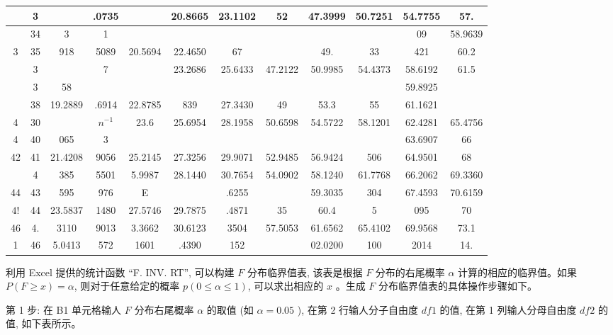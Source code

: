 \documentclass[10pt]{article}
\begin{document}
\begin{CJK*}{UTF8}{bsmi}
\begin{center}
\begin{tabular}{|c|c|c|c|c|c|c|c|c|c|c|c|}
 & 3 &  & .0735 &  & 20.8665 & 23.1102 & 52 & 47.3999 & 50.7251 & 54.7755 & 57. \\
\hline
 & 34 & 3 & 1 &  &  &  &  &  &  & 09 & 58.9639 \\
\hline
3 & 35 & 918 & 5089 & 20.5694 & 22.4650 & 67 &  & 49. & 33 & 421 & 60.2 \\
\hline
 & 3 &  & 7 &  & 23.2686 & 25.6433 & 47.2122 & 50.9985 & 54.4373 & 58.6192 & 61.5 \\
\hline
 & 3 & 58 &  &  &  &  &  &  &  & 59.8925 &  \\
\hline
 & 38 & 19.2889 & .6914 & 22.8785 & 839 & 27.3430 & 49 & 53.3 & 55 & 61.1621 &  \\
\hline
4 & 30 &  & $n^{-1}$ & 23.6 & 25.6954 & 28.1958 & 50.6598 & 54.5722 & 58.1201 & 62.4281 & 65.4756 \\
\hline
4 & 40 & 065 & 3 &  &  &  &  &  &  & 63.6907 & 66 \\
\hline
42 & 41 & 21.4208 & 9056 & 25.2145 & 27.3256 & 29.9071 & 52.9485 & 56.9424 & 506 & 64.9501 & 68 \\
\hline
 & 4 & 385 & 5501 & 5.9987 & 28.1440 & 30.7654 & 54.0902 & 58.1240 & 61.7768 & 66.2062 & 69.3360 \\
\hline
44 & 43 & 595 & 976 & E &  & .6255 &  & 59.3035 & 304 & 67.4593 & 70.6159 \\
\hline
$4 !$ & 44 & 23.5837 & 1480 & 27.5746 & 29.7875 & .4871 & 35 & 60.4 & 5 & 095 & 70 \\
\hline
46 & 4. & 3110 & 9013 & 3.3662 & 30.6123 & 3504 & 57.5053 & 61.6562 & 65.4102 & 69.9568 & 73.1 \\
\hline
1 & 46 & 5.0413 & 572 & 1601 & .4390 & 152 &  & 02.0200 & 100 & 2014 & 14. \\
\hline
\end{tabular}
\end{center}

\begin{center}
\end{center}

利用 Excel 提供的统计函数 “F. INV. RT”, 可以构建 $F$ 分布临界值表, 该表是根据 $F$ 分布的右尾概率 $\alpha$ 计算的相应的临界值。如果 $P(F \geqslant x)=\alpha$, 则对于任意给定的概率 $p(0 \leqslant \alpha \leqslant 1)$, 可以求出相应的 $x$ 。生成 $F$ 分布临界值表的具体操作步骤如下。

第 1 步: 在 B1 单元格输人 $F$ 分布右尾概率 $\alpha$ 的取值 (如 $\alpha=0.05$ ), 在第 2 行输人分子自由度 $d f 1$ 的值, 在第 1 列输人分母自由度 $d f 2$ 的值, 如下表所示。


\end{CJK*}
\end{document}
